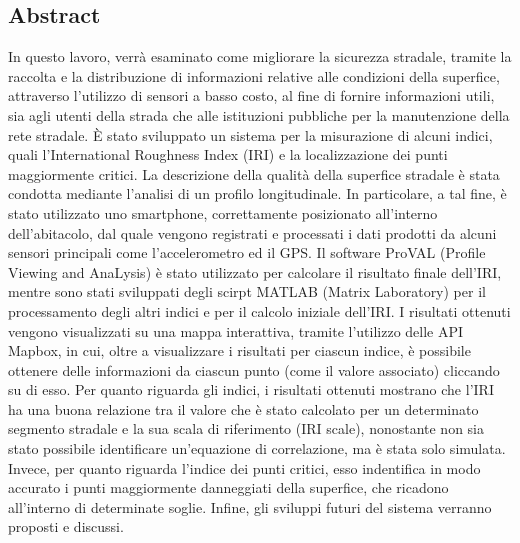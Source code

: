 \documentclass[tesi]{subfiles}
\begin{document}
\begin{flushright}
\section*{Abstract}\label{Abstract_IT}
\vspace{10mm}
\end{flushright}
In questo lavoro, verrà esaminato come migliorare la sicurezza stradale, tramite la raccolta e la distribuzione di informazioni relative alle condizioni della superfice, attraverso l’utilizzo di sensori a basso costo, al fine di fornire informazioni utili, sia agli utenti della strada che alle istituzioni pubbliche per la manutenzione della rete stradale. È stato sviluppato un sistema per la misurazione di alcuni indici, quali l’International Roughness Index (IRI) e la localizzazione dei punti maggiormente critici. La descrizione della qualità della superfice stradale è stata condotta mediante l’analisi di un profilo longitudinale. In particolare, a tal fine, è stato utilizzato uno smartphone, correttamente posizionato all’interno dell’abitacolo, dal quale vengono registrati e processati i dati prodotti da alcuni sensori principali come l’accelerometro ed il GPS. Il software ProVAL (Profile Viewing and AnaLysis) è stato utilizzato per calcolare il risultato finale dell’IRI, mentre sono stati sviluppati degli scirpt MATLAB (Matrix Laboratory) per il processamento degli altri indici e per il calcolo iniziale dell’IRI. I risultati ottenuti vengono visualizzati su una mappa interattiva, tramite l’utilizzo delle API Mapbox, in cui, oltre a visualizzare i risultati per ciascun indice, è possibile ottenere delle informazioni da ciascun punto (come il valore associato) cliccando su di esso.  Per quanto riguarda gli indici, i risultati ottenuti mostrano che l’IRI ha una buona relazione tra il valore che è stato calcolato per un determinato segmento stradale e la sua scala di riferimento (IRI scale), nonostante non sia stato possibile identificare un’equazione di correlazione, ma è stata solo simulata. Invece, per quanto riguarda l’indice dei punti critici, esso indentifica in modo accurato i punti maggiormente danneggiati della superfice, che ricadono all’interno di determinate soglie. Infine, gli sviluppi futuri del sistema verranno proposti e discussi.
\clearpage
\end{document}
